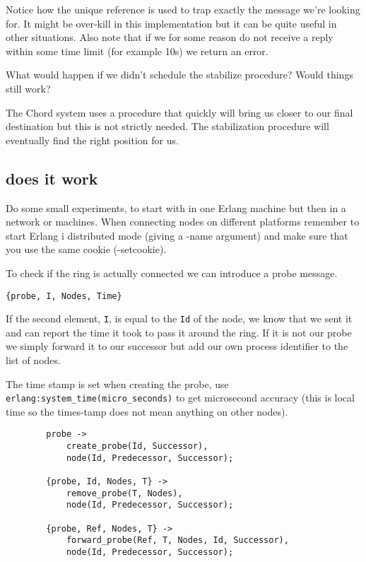 \documentclass[a4paper,11pt]{article}
\begin{document}
Notice how the unique reference is used to trap exactly the message
we're looking for. It might be over-kill in this implementation but it
can be quite useful in other situations. Also note that if we for
some reason do not receive a reply within some time limit (for example
10s) we return an error.

What would happen if we didn't schedule the stabilize procedure?
Would things still work?

The Chord system uses a procedure that quickly will bring us
closer to our final destination but this is not strictly needed. The
stabilization procedure will eventually find the right position for us.

\subsection{does it work}

Do some small experiments, to start with in one Erlang machine but
then in a network or machines. When connecting nodes on different
platforms remember to start Erlang i distributed mode (giving a -name
argument) and make sure that you use the same cookie (-setcookie). 

To check if the ring is actually connected we can introduce a probe message.

\begin{verbatim}
{probe, I, Nodes, Time}
\end{verbatim}

If the second element, {\tt I}, is equal to the {\tt Id} of the node,
we know that we sent it and can report the time it took to pass it
around the ring. If it is not our probe we simply forward it to our
successor but add our own process identifier to the list of nodes. 

The time stamp is set when creating the probe, use {\tt erlang:system\_time(micro\_seconds)}
to get microsecond accuracy (this is local time so the times-tamp does
not mean anything on other nodes). 

\begin{verbatim}
        probe ->
            create_probe(Id, Successor),
            node(Id, Predecessor, Successor);

        {probe, Id, Nodes, T} ->
            remove_probe(T, Nodes),
            node(Id, Predecessor, Successor);

        {probe, Ref, Nodes, T} ->
            forward_probe(Ref, T, Nodes, Id, Successor),
            node(Id, Predecessor, Successor);
\end{verbatim}
\end{document}
